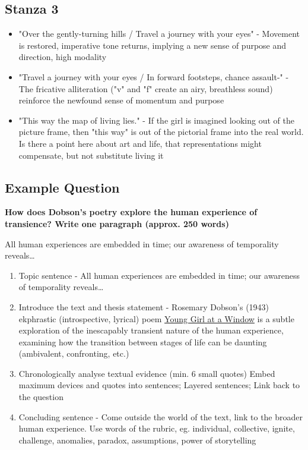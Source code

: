 	\subsection{Stanza 3}
		\begin{itemize}
			\item "Over the gently-turning hills / Travel a journey with your eyes" - Movement is restored, imperative tone returns, implying a new sense of purpose and direction, high modality
			\item "Travel a journey with your eyes / In forward footsteps, chance assault-" - The fricative alliteration ("v" and "f" create an airy, breathless sound) reinforce the newfound sense of momentum and purpose
			\item "This way the map of living lies." - If the girl is imagined looking out of the picture frame, then "this way" is out of the pictorial frame into the real world. Is there a point here about art and life, that representations might compensate, but not substitute living it
		\end{itemize}

	\subsection{Example Question} \label{(cont.) 6/11/2024}
		\textbf{How does Dobson's poetry explore the human experience of transience? Write one paragraph (approx. 250 words)}

		All human experiences are embedded in time; our awareness of temporality reveals\dots
		\begin{enumerate}
			\item Topic sentence - All human experiences are embedded in time; our awareness of temporality reveals\dots
			\item Introduce the text and thesis statement - Rosemary Dobson's (1943) ekphrastic (introspective, lyrical) poem \underline{Young Girl at a Window} is a subtle exploration of the inescapably transient nature of the human experience, examining how the transition between stages of life can be daunting (ambivalent, confronting, etc.)
			\item Chronologically analyse textual evidence (min. 6 small quotes)
				\subitem Embed maximum devices and quotes into sentences; Layered sentences; Link back to the question
			\item Concluding sentence - Come outside the world of the text, link to the broader human experience. Use words of the rubric, eg. individual, collective, ignite, challenge, anomalies, paradox, assumptions, power of storytelling
		\end{enumerate}

